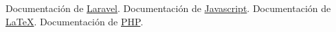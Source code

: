 \begin{thebibliography}{0}
  \bibitem Documentación de \href{https://laraveles.com/documentacion/}{Laravel}.
  \bibitem Documentación de \href{https://developer.mozilla.org/es/docs/Web/JavaScript}{Javascript}.
  \bibitem Documentación de \href{https://es.wikibooks.org/wiki/Manual_de_LaTeX/Texto_completo}{\LaTeX}.
  \bibitem Documentación de \href{https://www.php.net/manual/es/index.php}{PHP}.
\end{thebibliography}